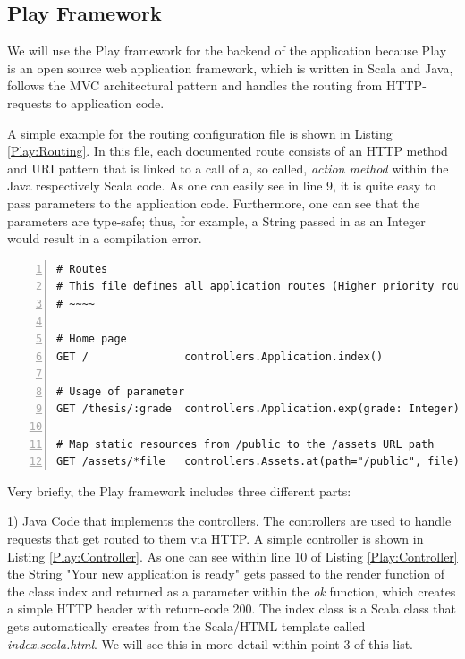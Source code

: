 \subsection{Play Framework}	
We will use the Play framework for the backend of the application because Play is an open source web application framework, which is written in Scala and Java, follows the \ac{MVC} architectural pattern and handles the routing from \ac{HTTP}-requests to application code. 

A simple example for the routing configuration file is shown in Listing \ref{Play:Routing}. In this file, each documented route consists of an \ac{HTTP} method and \ac{URI} pattern that is linked to a call of a, so called, \textit{action method} within the Java respectively Scala code. As one can easily see in line 9, it is quite easy to pass parameters to the application code. Furthermore, one can see that the parameters are type-safe; thus, for example, a String passed in as an Integer would result in a compilation error. 

\begin{lstlisting}[numbers=left,caption={Simple routing configuration file within the Play Framework},label=Play:Routing,frame=tlbr,breaklines]
# Routes
# This file defines all application routes (Higher priority routes first)
# ~~~~

# Home page
GET /               controllers.Application.index()

# Usage of parameter
GET /thesis/:grade  controllers.Application.exp(grade: Integer)

# Map static resources from /public to the /assets URL path
GET /assets/*file   controllers.Assets.at(path="/public", file)
\end{lstlisting}

Very briefly, the Play framework includes three different parts: 

1) Java Code that implements the controllers. The controllers are used to handle requests that get routed to them via \ac{HTTP}. A simple controller is shown in Listing \ref{Play:Controller}. As one can see within line 10 of Listing \ref{Play:Controller} the String "Your new application is ready" gets passed to the render function of the class index and returned as a parameter within the \textit{ok} function, which creates a simple \ac{HTTP} header with return-code 200. The index class is a Scala class that gets automatically creates from the Scala/\ac{HTML} template called \textit{index.scala.html}. We will see this in more detail within point 3 of this list.

